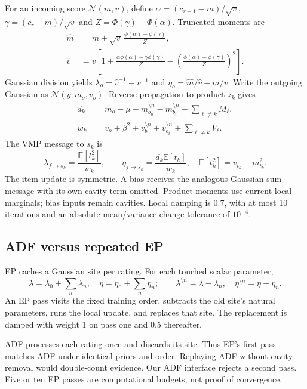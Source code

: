 \documentclass[12pt,a4paper]{article}
\newcommand{\E}{\mathbb E}
\newcommand{\N}{\mathcal N}
\begin{document}
For an incoming score $\N(m,v)$, define $\alpha=(c_{r-1}-m)/\sqrt v$,
$\gamma=(c_r-m)/\sqrt v$ and $Z=\Phi(\gamma)-\Phi(\alpha)$. Truncated moments are
\begin{align}
\widehat m&=m+\sqrt v\,\frac{\phi(\alpha)-\phi(\gamma)}{Z},\\
\widehat v&=v\left[1+\frac{\alpha\phi(\alpha)-\gamma\phi(\gamma)}{Z}
-\left(\frac{\phi(\alpha)-\phi(\gamma)}{Z}\right)^2\right].
\end{align}
Gaussian division yields $\lambda_o=\widehat v^{-1}-v^{-1}$ and
$\eta_o=\widehat m/\widehat v-m/v$. Write the outgoing Gaussian as
$\N(y;m_o,v_o)$. Reverse propagation to product $z_k$ gives
\begin{align}
d_k&=m_o-\mu-m^{\setminus n}_{b_u}-m^{\setminus n}_{b_i}-\sum_{\ell\ne k}M_\ell,\\
w_k&=v_o+\beta^2+v^{\setminus n}_{b_u}+v^{\setminus n}_{b_i}+\sum_{\ell\ne k}V_\ell.
\end{align}
The VMP message to $s_k$ is
\begin{equation}
\lambda_{f\to s_k}=\frac{\E[t_k^2]}{w_k},\qquad
\eta_{f\to s_k}=\frac{d_k\E[t_k]}{w_k},\quad
\E[t_k^2]=v_{t_k}+m_{t_k}^2.
\end{equation}
The item update is symmetric. A bias receives the analogous Gaussian sum
message with its own cavity term omitted. Product moments use current local
marginals; bias inputs remain cavities. Local damping is 0.7, with at most
10 iterations and an absolute mean/variance change tolerance of $10^{-4}$.

\subsection{ADF versus repeated EP}
EP caches a Gaussian site per rating. For each touched scalar parameter,
\begin{equation}
\lambda=\lambda_0+\sum_n\lambda_n,\quad \eta=\eta_0+\sum_n\eta_n;
\qquad
\lambda^{\setminus n}=\lambda-\lambda_n,\quad
\eta^{\setminus n}=\eta-\eta_n.\label{eq:cavity}
\end{equation}
An EP pass visits the fixed training order, subtracts the old site's natural
parameters, runs the local update, and replaces that site. The replacement is
damped with weight 1 on pass one and 0.5 thereafter.

ADF processes each rating once and discards its site. Thus EP's first pass
matches ADF under identical priors and order. Replaying ADF without cavity
removal would double-count evidence. Our ADF interface rejects a second pass.
Five or ten EP passes are computational budgets, not proof of convergence.
\end{document}
